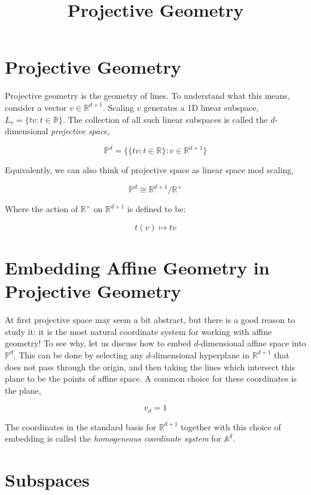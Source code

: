 \documentclass{article}[11pt]
\title{Projective Geometry}
\begin{document}
\maketitle

\section{Projective Geometry}

Projective geometry is the geometry of lines.  To understand what this means, consider a vector $v \in \mathbb{R}^{d+1}$.  Scaling $v$ generates a 1D linear subspace, $L_v = \{ t v : t \in \mathbb{R} \}$.  The collection of all such linear subspaces is called the $d$-dimensional \emph{projective space},

\[ \mathbb{P}^d = \{ \{ t v : t \in \mathbb{R} \} : v \in \mathbb{R}^{d+1} \} \]

Equivalently, we can also think of projective space as linear space mod scaling,

\[ \mathbb{P}^d \cong \mathbb{R}^{d+1} / \mathbb{R}^{\times} \]

Where the action of $\mathbb{R}^{\times}$ on $\mathbb{R}^{d+1}$ is defined to be:

\[ t(v) \mapsto t v \]

\section{Embedding Affine Geometry in Projective Geometry}

At first projective space may seem a bit abstract, but there is a good reason to study it:  it is the most natural coordinate system for working with affine geometry!  To see why, let us discuss how to embed $d$-dimensional affine space into $\mathbb{P}^d$.  This can be done by selecting any $d$-dimensional hyperplane in $\mathbb{R}^{d+1}$ that does not pass through the origin, and then taking the lines which intersect this plane to be the points of affine space.  A common choice for these coordinates is the plane,

\[ v_d = 1 \]

The coordinates in the standard basis for $\mathbb{R}^{d+1}$ together with this choice of embedding is called the \emph{homogeneous coordinate system} for $\mathbb{A}^d$.

\section{Subspaces}
\end{document}
